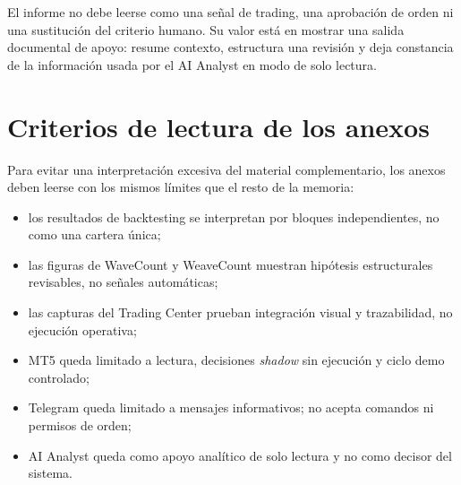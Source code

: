 El informe no debe leerse como una se\~nal de trading, una aprobaci\'on de orden ni
una sustituci\'on del criterio humano. Su valor est\'a en mostrar una salida
documental de apoyo: resume contexto, estructura una revisi\'on y deja constancia
de la informaci\'on usada por el AI Analyst en modo de solo lectura.

\section{Criterios de lectura de los anexos}
\label{sec:anexos-criterios-lectura}

Para evitar una interpretaci\'on excesiva del material complementario, los
anexos deben leerse con los mismos l\'imites que el resto de la memoria:

\begin{itemize}
  \item los resultados de backtesting se interpretan por bloques independientes,
  no como una cartera \'unica;
  \item las figuras de WaveCount y WeaveCount muestran hip\'otesis estructurales
  revisables, no se\~nales autom\'aticas;
  \item las capturas del Trading Center prueban integraci\'on visual y
  trazabilidad, no ejecuci\'on operativa;
  \item MT5 queda limitado a lectura, decisiones \textit{shadow} sin ejecuci\'on
  y ciclo demo controlado;
  \item Telegram queda limitado a mensajes informativos; no acepta comandos
  ni permisos de orden;
  \item AI Analyst queda como apoyo anal\'itico de solo lectura y no como decisor
  del sistema.
\end{itemize}
